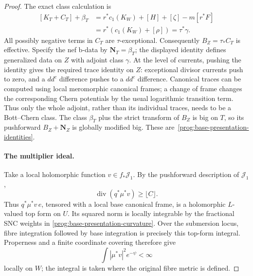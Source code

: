 \begin{proof}
The exact class calculation is
\[
 \begin{split}
 [K_T+C_T]+\beta_T
 &=r^*c_1(K_W)+[H]+[\zeta]-m[r^*F]\\
 &=r^*(c_1(K_W)+[\rho])=\tau^*\gamma.
 \end{split}
\]
All possibly negative terms in $C_T$ are $\tau$-exceptional.
Consequently $B_Z=\tau_*C_T$ is effective. Specify the nef b-data by
$\mathbf N_T=\beta_T$; the displayed identity defines generalized
data on $Z$ with adjoint class $\gamma$. At the level of currents,
pushing the identity gives the required trace identity on $Z$:
exceptional divisor currents push to zero, and a $dd^c$ difference
pushes to a $dd^c$ difference. Canonical traces can be computed using
local meromorphic canonical frames; a change of frame changes the
corresponding Chern potentials by the usual logarithmic transition
term. Thus only the whole adjoint, rather
than its individual traces, needs to be a Bott--Chern class. The
class $\beta_T$ plus the strict transform of $B_Z$ is big on $T$,
so its pushforward $B_Z+\mathbf N_Z$ is globally modified big.
These are~\eqref{prog:base-presentation-identities}.

\paragraph{The multiplier ideal.}
Take a local holomorphic function $v\in f_*\mathcal J_1$. By the
pushforward description of $\mathcal J_1$,
\begin{equation}\label{prog:base-presentation-source-orders}
 \operatorname{div}(q^*\mu^*v)\geq\lfloor C\rfloor.
\end{equation}
Thus $q^*\mu^*v\,e$, tensored with a local base canonical frame,
is a holomorphic $L$-valued top form on $U$. Its squared norm is
locally integrable by the fractional SNC weights in
\eqref{prog:base-presentation-curvature}. Over the submersion locus,
fibre integration followed by base integration is precisely this
top-form integral. Properness and a finite coordinate covering
therefore give
\begin{equation}\label{prog:base-presentation-base-integral}
 \int |\mu^*v|^2e^{-\psi}<\infty
\end{equation}
locally on $W$; the integral is taken where the original fibre
metric is defined.


\end{proof}
